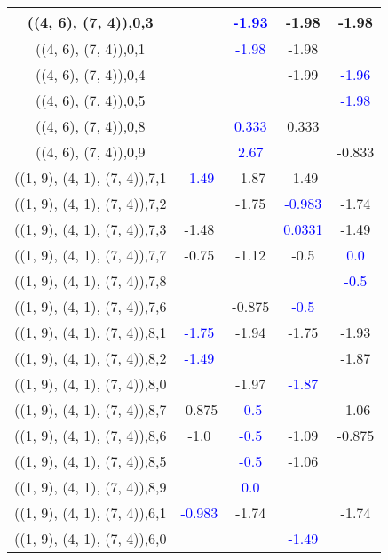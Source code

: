 \documentclass{article}
\begin{document}
\begin{center}
\begin{longtable}{|c|c|c|c|c|}
        	\hline
        	((4, 6), (7, 4)),0,3&& \textcolor{blue}{-1.93}&-1.98&-1.98\\
        	\hline
        	((4, 6), (7, 4)),0,1&& \textcolor{blue}{-1.98}&-1.98&\\
        	\hline
        	((4, 6), (7, 4)),0,4&&&-1.99& \textcolor{blue}{-1.96}\\
        	\hline
        	((4, 6), (7, 4)),0,5&&&& \textcolor{blue}{-1.98}\\
        	\hline
        	((4, 6), (7, 4)),0,8&& \textcolor{blue}{0.333}&0.333&\\
        	\hline
        	((4, 6), (7, 4)),0,9&& \textcolor{blue}{2.67}&&-0.833\\
        	\hline
        	((1, 9), (4, 1), (7, 4)),7,1& \textcolor{blue}{-1.49}&-1.87&-1.49&\\
        	\hline
        	((1, 9), (4, 1), (7, 4)),7,2&&-1.75& \textcolor{blue}{-0.983}&-1.74\\
        	\hline
        	((1, 9), (4, 1), (7, 4)),7,3&-1.48&& \textcolor{blue}{0.0331}&-1.49\\
        	\hline
        	((1, 9), (4, 1), (7, 4)),7,7&-0.75&-1.12&-0.5& \textcolor{blue}{0.0}\\
        	\hline
        	((1, 9), (4, 1), (7, 4)),7,8&&&& \textcolor{blue}{-0.5}\\
        	\hline
        	((1, 9), (4, 1), (7, 4)),7,6&&-0.875& \textcolor{blue}{-0.5}&\\
        	\hline
        	((1, 9), (4, 1), (7, 4)),8,1& \textcolor{blue}{-1.75}&-1.94&-1.75&-1.93\\
        	\hline
        	((1, 9), (4, 1), (7, 4)),8,2& \textcolor{blue}{-1.49}&&&-1.87\\
        	\hline
        	((1, 9), (4, 1), (7, 4)),8,0&&-1.97& \textcolor{blue}{-1.87}&\\
        	\hline
        	((1, 9), (4, 1), (7, 4)),8,7&-0.875& \textcolor{blue}{-0.5}&&-1.06\\
        	\hline
        	((1, 9), (4, 1), (7, 4)),8,6&-1.0& \textcolor{blue}{-0.5}&-1.09&-0.875\\
        	\hline
        	((1, 9), (4, 1), (7, 4)),8,5&& \textcolor{blue}{-0.5}&-1.06&\\
        	\hline
        	((1, 9), (4, 1), (7, 4)),8,9&& \textcolor{blue}{0.0}&&\\
        	\hline
        	((1, 9), (4, 1), (7, 4)),6,1& \textcolor{blue}{-0.983}&-1.74&&-1.74\\
        	\hline
        	((1, 9), (4, 1), (7, 4)),6,0&&& \textcolor{blue}{-1.49}&\\

\end{longtable}
\end{center}
\end{document}
